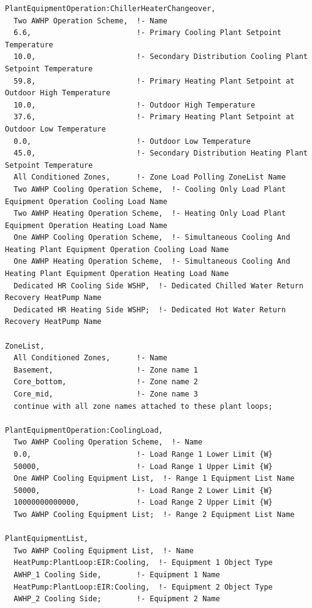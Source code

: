 \begin{lstlisting}
PlantEquipmentOperation:ChillerHeaterChangeover,
  Two AWHP Operation Scheme,  !- Name
  6.6,                        !- Primary Cooling Plant Setpoint Temperature
  10.0,                       !- Secondary Distribution Cooling Plant Setpoint Temperature
  59.8,                       !- Primary Heating Plant Setpoint at Outdoor High Temperature
  10.0,                       !- Outdoor High Temperature
  37.6,                       !- Primary Heating Plant Setpoint at Outdoor Low Temperature
  0.0,                        !- Outdoor Low Temperature
  45.0,                       !- Secondary Distribution Heating Plant Setpoint Temperature
  All Conditioned Zones,      !- Zone Load Polling ZoneList Name
  Two AWHP Cooling Operation Scheme,  !- Cooling Only Load Plant Equipment Operation Cooling Load Name
  Two AWHP Heating Operation Scheme,  !- Heating Only Load Plant Equipment Operation Heating Load Name
  One AWHP Cooling Operation Scheme,  !- Simultaneous Cooling And Heating Plant Equipment Operation Cooling Load Name
  One AWHP Heating Operation Scheme,  !- Simultaneous Cooling And Heating Plant Equipment Operation Heating Load Name
  Dedicated HR Cooling Side WSHP,  !- Dedicated Chilled Water Return Recovery HeatPump Name
  Dedicated HR Heating Side WSHP;  !- Dedicated Hot Water Return Recovery HeatPump Name

ZoneList,
  All Conditioned Zones,      !- Name
  Basement,                   !- Zone name 1
  Core_bottom,                !- Zone name 2
  Core_mid,                   !- Zone name 3
  continue with all zone names attached to these plant loops;

PlantEquipmentOperation:CoolingLoad,
  Two AWHP Cooling Operation Scheme,  !- Name
  0.0,                        !- Load Range 1 Lower Limit {W}
  50000,                      !- Load Range 1 Upper Limit {W}
  One AWHP Cooling Equipment List,  !- Range 1 Equipment List Name
  50000,                      !- Load Range 2 Lower Limit {W}
  10000000000000,             !- Load Range 2 Upper Limit {W}
  Two AWHP Cooling Equipment List;  !- Range 2 Equipment List Name

PlantEquipmentList,
  Two AWHP Cooling Equipment List,  !- Name
  HeatPump:PlantLoop:EIR:Cooling,  !- Equipment 1 Object Type
  AWHP_1 Cooling Side,        !- Equipment 1 Name
  HeatPump:PlantLoop:EIR:Cooling,  !- Equipment 2 Object Type
  AWHP_2 Cooling Side;        !- Equipment 2 Name
\end{lstlisting}

